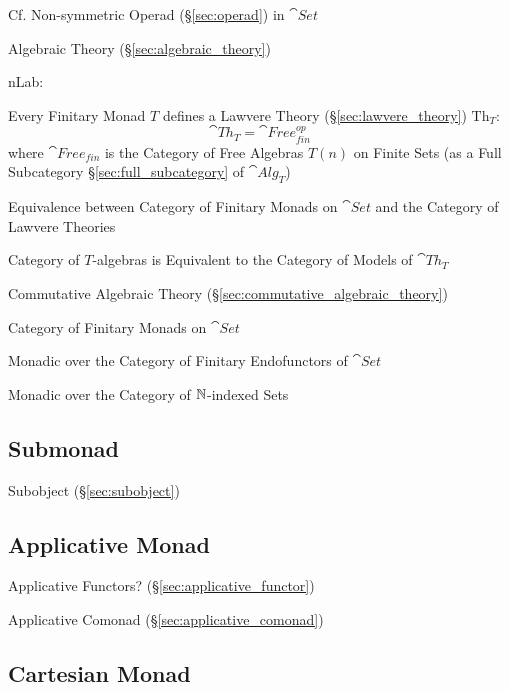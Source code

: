 \fist Cf. Non-symmetric Operad (\S\ref{sec:operad}) in
$\cat{Set}$


\asterism


Algebraic Theory (\S\ref{sec:algebraic_theory})

nLab:

Every Finitary Monad $T$ defines a Lawvere Theory
(\S\ref{sec:lawvere_theory}) $\mathrm{Th}_T$:
\[
  \cat{Th}_T = \cat{Free}^{op}_{fin}
\]
where $\cat{Free}_{fin}$ is the Category of Free Algebras $T(n)$ on
Finite Sets (as a Full Subcategory \S\ref{sec:full_subcategory} of
$\cat{Alg}_T$) %

Equivalence between Category of Finitary Monads on $\cat{Set}$ and the
Category of Lawvere Theories %

Category of $T$-algebras is Equivalent to the Category of Models of
$\cat{Th}_T$ %

Commutative Algebraic Theory
(\S\ref{sec:commutative_algebraic_theory})

Category of Finitary Monads on $\cat{Set}$

Monadic over the Category of Finitary Endofunctors of $\cat{Set}$

Monadic over the Category of $\mathbb{N}$-indexed Sets



\subsection{Submonad}\label{sec:submonad}

Subobject (\S\ref{sec:subobject})



\subsection{Applicative Monad}\label{sec:applicative_monad}

Applicative Functors? (\S\ref{sec:applicative_functor})

Applicative Comonad (\S\ref{sec:applicative_comonad})



\subsection{Cartesian Monad}\label{sec:cartesian_monad}


